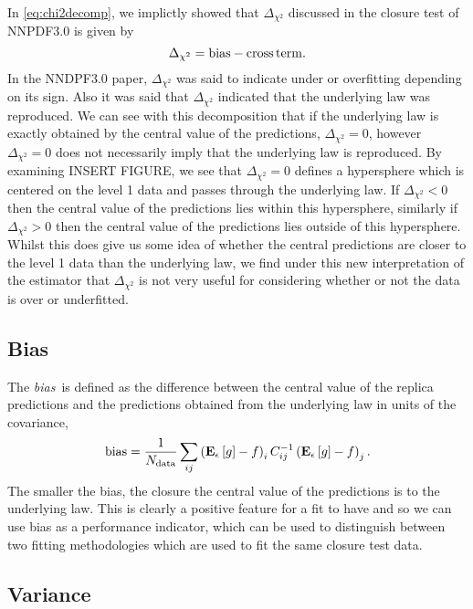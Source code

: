 In \eqref{eq:chi2decomp}, we implictly showed that $\Delta_{\chi^2}$ discussed
in the closure test of NNPDF3.0 is given by
\begin{equation}
    \Delta_{\chi^2} = {\rm bias} - {\rm cross\,term}.
\end{equation}
In the NNDPF3.0 paper, $\Delta_{\chi^2}$ was said to indicate under or overfitting
depending on its sign. Also it was said that $\Delta_{\chi^2}$ indicated that
the underlying law was reproduced. We can see with this decomposition that
if the underlying law is exactly obtained by the central value of the predictions,
$\Delta_{\chi^2}=0$, however $\Delta_{\chi^2}=0$ does not necessarily imply that
the underlying law is reproduced. By examining INSERT FIGURE, we see that
$\Delta_{\chi^2} = 0$ defines a hypersphere which is centered on the level 1 data
and passes through the underlying law. If $\Delta_{\chi^2} < 0$ then the central
value of the predictions lies within this hypersphere, similarly if
$\Delta_{\chi^2} > 0$ then the central value of the predictions lies outside
of this hypersphere. Whilst this does give us some idea of whether the central
predictions are closer to the level 1 data than the underlying law, we find
under this new interpretation of the estimator that $\Delta_{\chi^2}$ is not
very useful for considering whether or not the data is over or underfitted.


\subsection{Bias}

The {\em bias}\ is defined as the difference between the central value of the
replica predictions and the predictions obtained from the underlying law in
units of the covariance, \ie 
\begin{equation}
    \label{eq:BiasDef}
    {\rm bias} = \frac{1}{N_{\rm data}} \sum_{ij} \left( \mathbf{E}_{\epsilon}\left[ g \right] - f \right)_i C^{-1}_{ij} \left( \mathbf{E}_{\epsilon}\left[ g \right] - f \right)_j.
\end{equation}
The smaller the bias, the closure the central value of the predictions is to
the underlying law. This is clearly a positive feature for a fit to have and so
we can use bias as a performance indicator, which can be used to distinguish
between two fitting methodologies which are used to fit the same closure test
data.

\subsection{Variance}

